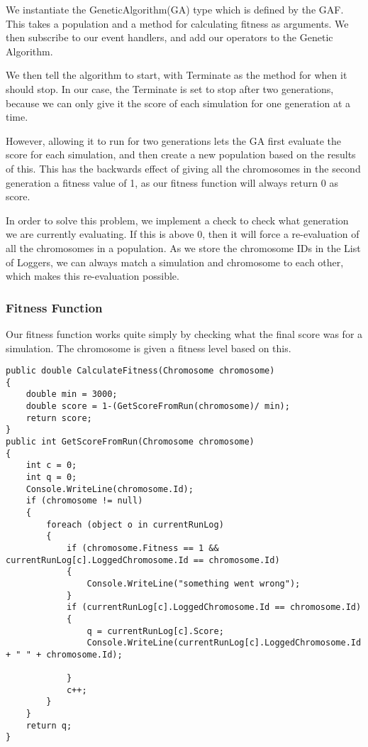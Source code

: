 We instantiate the GeneticAlgorithm(GA) type which is defined by the GAF. This takes a population and a method for calculating fitness as arguments.
We then subscribe to our event handlers, and add our operators to the Genetic Algorithm.

We then tell the algorithm to start, with Terminate as the method for when it should stop. In our case, the Terminate is set to stop after two generations, because we can only give it the score of each simulation for one generation at a time.

However, allowing it to run for two generations lets the GA first evaluate the score for each simulation, and then create a new population based on the results of this. This has the backwards effect of giving all the chromosomes in the second generation a fitness value of 1, as our fitness function will always return 0 as score.

In order to solve this problem, we implement a check to check what generation we are currently evaluating. If this is above 0, then it will force a re-evaluation of all the chromosomes in a population. As we store the chromosome IDs in the List of Loggers, we can always match a simulation and chromosome to each other, which makes this re-evaluation possible.

\subsubsection*{Fitness Function}
Our fitness function works quite simply by checking what the final score was for a simulation. The chromosome is given a fitness level based on this.

\begin{lstlisting}[caption=snippet of frmScreen.cs. Methods to calculate fitness for each chromosome., label=lst:fitness]
public double CalculateFitness(Chromosome chromosome)
{
	double min = 3000;
	double score = 1-(GetScoreFromRun(chromosome)/ min);
	return score;
}
public int GetScoreFromRun(Chromosome chromosome)
{
	int c = 0;
	int q = 0;
	Console.WriteLine(chromosome.Id);
	if (chromosome != null)
	{
		foreach (object o in currentRunLog)
		{
			if (chromosome.Fitness == 1 && currentRunLog[c].LoggedChromosome.Id == chromosome.Id)
			{
				Console.WriteLine("something went wrong");
			}
			if (currentRunLog[c].LoggedChromosome.Id == chromosome.Id)
			{
				q = currentRunLog[c].Score;
				Console.WriteLine(currentRunLog[c].LoggedChromosome.Id + " " + chromosome.Id);

			}
			c++;
		}
	}
	return q;
}
\end{lstlisting}

